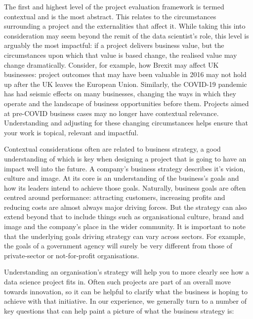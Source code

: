 \documentclass[
]{book}
\begin{document}
The first and highest level of the project evaluation framework is termed contextual and is the most abstract. This relates to the circumstances surrounding a project and the externalities that affect it. While taking this into consideration may seem beyond the remit of the data scientist's role, this level is arguably the most impactful: if a project delivers business value, but the circumstances upon which that value is based change, the realised value may change dramatically. Consider, for example, how Brexit may affect UK businesses: project outcomes that may have been valuable in 2016 may not hold up after the UK leaves the European Union. Similarly, the COVID-19 pandemic has had seismic effects on many businesses, changing the ways in which they operate and the landscape of business opportunities before them. Projects aimed at pre-COVID business cases may no longer have contextual relevance. Understanding and adjusting for these changing circumstances helps ensure that your work is topical, relevant and impactful.

Contextual considerations often are related to business strategy, a good understanding of which is key when designing a project that is going to have an impact well into the future. A company's business strategy describes it's vision, culture and image. At its core is an understanding of the business's goals and how its leaders intend to achieve those goals. Naturally, business goals are often centred around performance: attracting customers, increasing profits and reducing costs are almost always major driving forces. But the strategy can also extend beyond that to include things such as organisational culture, brand and image and the company's place in the wider community. It is important to note that the underlying goals driving strategy can vary across sectors. For example, the goals of a government agency will surely be very different from those of private-sector or not-for-profit organisations.

Understanding an organisation's strategy will help you to more clearly see how a data science project fits in. Often such projects are part of an overall move towards innovation, so it can be helpful to clarify what the business is hoping to achieve with that initiative. In our experience, we generally turn to a number of key questions that can help paint a picture of what the business strategy is:
\end{document}
